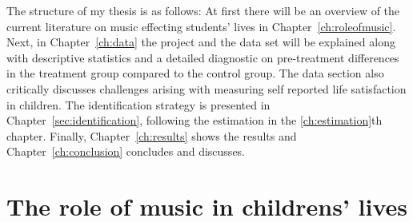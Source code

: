 \documentclass[a4, 12pt]{article}
\begin{document}
The structure of my thesis is as follows: At first there will be an overview of the current literature on music effecting students' lives in Chapter~\ref{ch:roleofmusic}. Next, in Chapter~\ref{ch:data} the project and the data set will be explained along with descriptive statistics and a detailed diagnostic on pre-treatment differences in the treatment group compared to the control group. The data section also critically discusses challenges arising with measuring self reported life satisfaction in children. The identification strategy is presented in Chapter~\ref{sec:identification}, following the estimation in the \ref{ch:estimation}th chapter. Finally, Chapter~\ref{ch:results} shows the results and Chapter~\ref{ch:conclusion} concludes and discusses.

\clearpage

\hypertarget{the-role-of-music-in-childrens-lives}{%
\section{The role of music in childrens' lives}\label{the-role-of-music-in-childrens-lives}}
\end{document}
